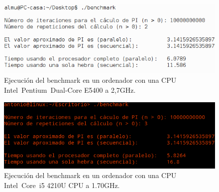 \begin{figure}[H]
  \begin{center}
    \includegraphics[width=1\textwidth]{imagenes/bench1}
    \caption{Ejecución del benchmark en un ordenador con una CPU Intel\textregistered\ Pentium\textregistered\ Dual-Core E5400 a 2,7GHz.}
    \label{fig16}
  \end{center}
\end{figure}

\begin{figure}[H]
  \begin{center}
    \includegraphics[width=1\textwidth]{imagenes/bench2}
    \caption{Ejecución del benchmark en un ordenador con una CPU Intel\textregistered\ Core\texttrademark\ i5 4210U CPU a 1.70GHz.}
    \label{fig17}
  \end{center}
\end{figure}
\newpage




